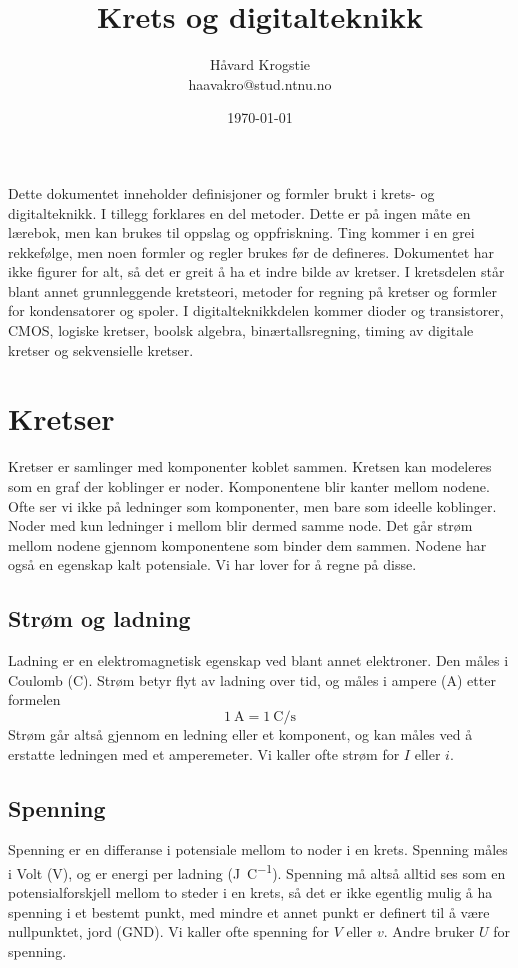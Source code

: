 \documentclass[12pt,a4paper,norsk]{article}
\title{Krets og digitalteknikk}
\author{Håvard Krogstie\\haavakro@stud.ntnu.no}
\date{\today}
\begin{document}
\maketitle

\noindent
Dette dokumentet inneholder definisjoner og formler brukt i krets- og
digitalteknikk. I tillegg forklares en del metoder. Dette er på ingen måte en
lærebok, men kan brukes til oppslag og oppfriskning. Ting kommer i en grei
rekkefølge, men noen formler og regler brukes før de defineres. Dokumentet har
ikke figurer for alt, så det er greit å ha et indre bilde av kretser. I
kretsdelen står blant annet grunnleggende kretsteori, metoder for regning på
kretser og formler for kondensatorer og spoler. I digitalteknikkdelen kommer
dioder og transistorer, CMOS, logiske kretser, boolsk algebra,
binærtallsregning, timing av digitale kretser og sekvensielle kretser.

\tableofcontents
\clearpage

\section{Kretser}
Kretser er samlinger med komponenter koblet sammen. Kretsen kan modeleres som en
graf der koblinger er noder. Komponentene blir kanter mellom
nodene. Ofte ser vi ikke på ledninger som komponenter, men bare som
ideelle koblinger. Noder med kun ledninger i mellom blir dermed samme node. Det
går strøm mellom nodene gjennom komponentene som binder dem sammen. Nodene har
også en egenskap kalt potensiale. Vi har lover for å regne på disse.

\subsection{Strøm og ladning}
Ladning er en elektromagnetisk egenskap ved blant annet elektroner. Den måles i
Coulomb (\si{\coulomb}). Strøm betyr flyt av ladning over tid, og måles i ampere
(\si{\ampere}) etter formelen
\[\SI{1}{\ampere} = \SI{1}{\coulomb\per\second}\]
Strøm går altså gjennom en ledning eller et komponent, og kan måles ved å
erstatte ledningen med et amperemeter. Vi kaller ofte strøm for $I$ eller $i$.

\subsection{Spenning}
Spenning er en differanse i potensiale mellom to noder i en krets. Spenning
måles i Volt (\si{\volt}), og er energi per ladning (\si{\joule\per\coulomb}).
Spenning må altså alltid ses som en potensialforskjell mellom to steder i en
krets, så det er ikke egentlig mulig å ha spenning i et bestemt punkt, med
mindre et annet punkt er definert til å være nullpunktet, jord (GND). Vi kaller
ofte spenning for $V$ eller $v$. Andre bruker $U$ for spenning.
\end{document}
